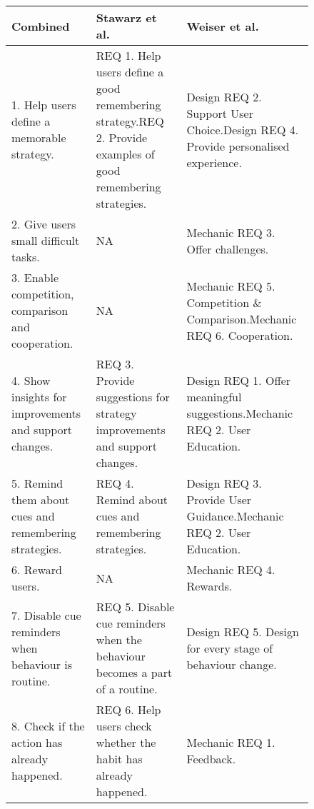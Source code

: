 \begin{figure}[ht] %

  \begin{tabular}{ |p{7cm}|p{7.5cm}|p{8cm}| }
    \hline
    \small{\textbf{Combined}} & \small{\textbf{Stawarz et al.~\cite{article_beyond_self_tracking_designing_apps}}} & \small{\textbf{Weiser et al.~\cite{article_taxonomy_motivational_affordances_meaningful}}} \\ \hline %
    \small{1. Help users define a memorable strategy.} & \small{REQ 1. Help users define a good remembering strategy.\newline REQ 2. Provide examples of good remembering strategies.} & \small{Design REQ 2. Support User Choice.\newline Design REQ 4. Provide personalised experience.} \\ \hline
    \small{2. Give users small difficult tasks.} & \small{N\/A} & \small{Mechanic REQ 3. Offer challenges.}\\ \hline
    \small{3. Enable competition, comparison and cooperation.} & \small{N\/A} & \small{Mechanic REQ 5. Competition \& Comparison.\newline Mechanic REQ 6. Cooperation.}\\ \hline
    \small{4. Show insights for improvements and support changes.} & \small{REQ 3. Provide suggestions for strategy improvements and support changes.} & \small{Design REQ 1. Offer meaningful suggestions.\newline Mechanic REQ 2. User Education.} \\ \hline
    \small{5. Remind them about cues and remembering strategies.} & \small{REQ 4. Remind about cues and remembering strategies.} & \small{Design REQ 3. Provide User Guidance.\newline Mechanic REQ 2. User Education.} \\ \hline
    \small{6. Reward users.} & \small{N\/A} & \small{Mechanic REQ 4. Rewards.} \\ \hline
    \small{7. Disable cue reminders when behaviour is routine.} & \small{REQ 5. Disable cue reminders when the behaviour becomes a part of a routine.} & \small{Design REQ 5. Design for every stage of behaviour change.} \\ \hline
    \small{8. Check if the action has already happened.} & \small{REQ 6. Help users check whether the habit has already happened.} & \small{Mechanic REQ 1. Feedback.} \\ \hline
  \end{tabular}
\end{figure}
